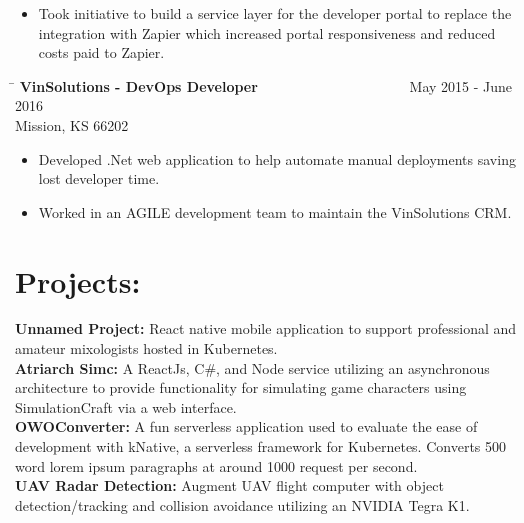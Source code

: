 \documentclass{res}
\begin{document}
\begin{resume}
\begin{changemargin}{-0.25in}{0in}
\begin{itemize}
		\item Took initiative to build a service layer for the developer portal to replace the integration with Zapier which increased portal responsiveness and reduced costs paid to Zapier. \vspace{-15pt}
	\end{itemize}
	\vspace{0.2in}
	\begin{tabbing}
	\hspace{5.5in}\= \kill 
	{\bf VinSolutions - DevOps Developer} \>~~~~~~~~~~~~~~~~~~~~~May 2015 - June 2016\\
	Mission, KS 66202
	\end{tabbing}\vspace{-1pt}
	\begin{itemize}
		\item Developed .Net web application to help automate manual deployments saving lost developer time.
		\item Worked in an AGILE development team to maintain the VinSolutions CRM.\vspace{-15pt}
	\end{itemize}
	\vspace{0.1in}
	\end{changemargin}
\section{Projects:}       
{
	\begin{changemargin}{-0.25in}{0in}
	\textbf{Unnamed Project:} React native mobile application to support professional and amateur mixologists hosted in Kubernetes.\\
	\textbf{Atriarch Simc:} A ReactJs, C\#, and Node service utilizing an asynchronous architecture to provide functionality for simulating game characters using SimulationCraft via a web interface.\\
	\textbf{OWOConverter:} A fun serverless application used to evaluate the ease of development with kNative, a serverless framework for Kubernetes. Converts 500 word lorem ipsum paragraphs at around 1000 request per second.\\
	\textbf{UAV Radar Detection:} Augment UAV flight computer with object detection/tracking and collision avoidance utilizing an NVIDIA Tegra K1.\\
	\end{changemargin}
}
\end{resume}
\end{document}
